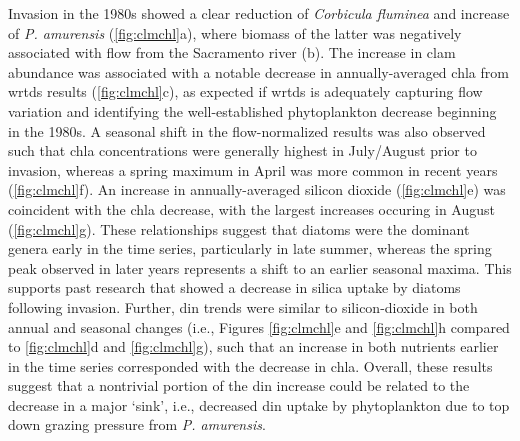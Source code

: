 \documentclass[letterpaper,12pt,oneside]{article}\usepackage[]{graphicx}\usepackage[]{color}
\begin{document}
Invasion in the 1980s showed a clear reduction of \textit{Corbicula fluminea} and increase of \textit{P. amurensis} (\cref{fig:clmchl}a), where biomass of the latter was negatively associated with flow from the Sacramento river (b).  The increase in clam abundance was associated with a notable decrease in annually-averaged \ac{chla} from \ac{wrtds} results (\cref{fig:clmchl}c), as expected if \ac{wrtds} is adequately capturing flow variation and identifying the well-established phytoplankton decrease beginning in the 1980s.  A seasonal shift in the flow-normalized results was also observed such that \ac{chla} concentrations were generally highest in July/August prior to invasion, whereas a spring maximum in April was more common in recent years (\cref{fig:clmchl}f).  An increase in annually-averaged silicon dioxide (\cref{fig:clmchl}e) was coincident with the \ac{chla} decrease, with the largest increases occuring in August (\cref{fig:clmchl}g).  These relationships suggest that diatoms were the dominant genera early in the time series, particularly in late summer, whereas the spring peak observed in later years represents a shift to an earlier seasonal maxima.  This supports past research that showed a decrease in silica uptake by diatoms following invasion.\cite{Cloern96,Kimmerer05} Further, \ac{din} trends were similar to silicon-dioxide in both annual and seasonal changes (i.e., Figures \ref{fig:clmchl}e and \ref{fig:clmchl}h compared to \ref{fig:clmchl}d and \ref{fig:clmchl}g), such that an increase in both nutrients earlier in the time series corresponded with the decrease in \ac{chla}.  Overall, these results suggest that a nontrivial portion of the \ac{din} increase could be related to the decrease in a major `sink', i.e., decreased \ac{din} uptake by phytoplankton due to top down grazing pressure from \textit{P. amurensis}.
\end{document}
